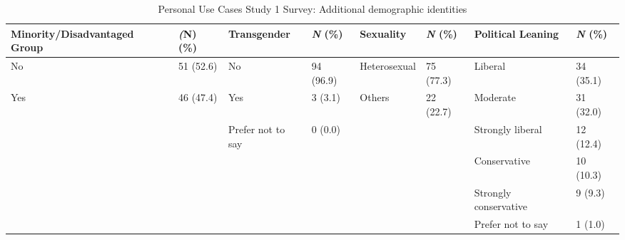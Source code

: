 \begin{table*}[htpb]
    \centering
    \footnotesize
    \begin{tabular}{ll|ll|ll|ll}
    \toprule
         \textbf{Minority/Disadvantaged Group} & \textbf{\textit(N) (\%)} & \textbf{Transgender} & \textbf{\textit{N} (\%)} & \textbf{Sexuality} & \textbf{\textit{N} (\%)} & \textbf{Political Leaning} & \textbf{\textit{N} (\%)} \\
         \midrule
No & 51 (52.6) & No & 94 (96.9) & Heterosexual & 75 (77.3) & Liberal & 34 (35.1)\\
Yes & 46 (47.4) & Yes & 3 (3.1) & Others & 22 (22.7) & Moderate & 31 (32.0)\\
 &  & Prefer not to say & 0 (0.0) & & & Strongly liberal & 12 (12.4)\\
 &  &  &  &  &  & Conservative & 10 (10.3)\\
 &  &  &  &  &  & Strongly conservative & 9 (9.3)\\
 &  &  &  &  &  & Prefer not to say & 1 (1.0)\\
\bottomrule
    \end{tabular}
    \caption{Personal Use Cases Study 1 Survey: Additional demographic identities}
    \label{app:demographics-2-personal-p1}
\end{table*}